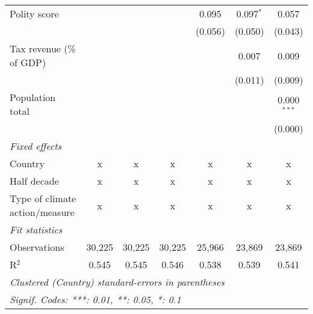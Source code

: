 \begin{tabular}{lcccccc}
   Polity score                                                           &         &         &               & 0.095         & 0.097$^{*}$   & 0.057\\   
                                                                          &         &         &               & (0.056)       & (0.050)       & (0.043)\\   
   Tax revenue (\% of GDP)                                                &         &         &               &               & 0.007         & 0.009\\   
                                                                          &         &         &               &               & (0.011)       & (0.009)\\   
   Population total                                                       &         &         &               &               &               & 0.000$^{***}$\\   
                                                                          &         &         &               &               &               & (0.000)\\   
   \emph{Fixed effects}\\
   Country                                                                & x       & x       & x             & x             & x             & x\\  
   Half decade                                                            & x       & x       & x             & x             & x             & x\\  
   Type of climate action/measure                                         & x       & x       & x             & x             & x             & x\\  
   \midrule \emph{Fit statistics}\\
   Observations                                                           & 30,225  & 30,225  & 30,225        & 25,966        & 23,869        & 23,869\\  
   R$^2$                                                                  & 0.545   & 0.545   & 0.546         & 0.538         & 0.539         & 0.541\\  
   \midrule
   \multicolumn{7}{l}{\emph{Clustered (Country) standard-errors in parentheses}}\\
   \multicolumn{7}{l}{\emph{Signif. Codes: ***: 0.01, **: 0.05, *: 0.1}}\\
\end{tabular}
\par\endgroup


